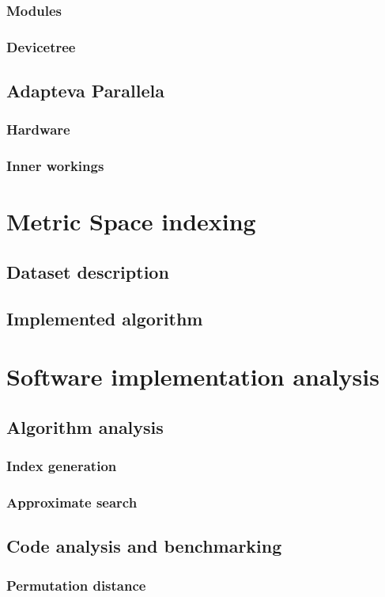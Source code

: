 \documentclass{iccmemoria}
\begin{document}
    \subsection{Modules}
    \subsection{Devicetree}
  \section{Adapteva Parallela} 
    \subsection{Hardware}
    \subsection{Inner workings}

\chapter{Metric Space indexing}
  \section{Dataset description}
  \section{Implemented algorithm}

\chapter{Software implementation analysis}
  \section{Algorithm analysis}
    \subsection{Index generation}
    \subsection{Approximate search}
  \section{Code analysis and benchmarking}
    \subsection{Permutation distance}
\end{document}
